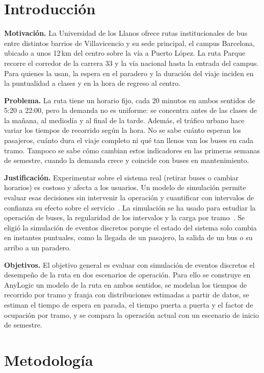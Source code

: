 \documentclass[runningheads]{llncs}
\begin{document}
\section{Introducción}

\textbf{Motivación.} La Universidad de los Llanos ofrece rutas institucionales de bus entre distintos barrios de Villavicencio y su sede principal, el campus Barcelona, ubicado a unos 12\,km del centro sobre la vía a Puerto López. La ruta Parque recorre el corredor de la carrera 33 y la vía nacional hasta la entrada del campus. Para quienes la usan, la espera en el paradero y la duración del viaje inciden en la puntualidad a clases y en la hora de regreso al centro.

\textbf{Problema.} La ruta tiene un horario fijo, cada 20 minutos en ambos sentidos de 5:20 a 22:00, pero la demanda no es uniforme: se concentra antes de las clases de la mañana, al mediodía y al final de la tarde. Además, el tráfico urbano hace variar los tiempos de recorrido según la hora. No se sabe cuánto esperan los pasajeros, cuánto dura el viaje completo ni qué tan llenos van los buses en cada tramo. Tampoco se sabe cómo cambian estos indicadores en las primeras semanas de semestre, cuando la demanda crece y coincide con buses en mantenimiento.

\textbf{Justificación.} Experimentar sobre el sistema real (retirar buses o cambiar horarios) es costoso y afecta a los usuarios. Un modelo de simulación permite evaluar esas decisiones sin intervenir la operación y cuantificar con intervalos de confianza su efecto sobre el servicio~\cite{law2015,banks2010}. La simulación se ha usado para estudiar la operación de buses, la regularidad de los intervalos y la carga por tramo~\cite{cats2010,ceder2016}. Se eligió la simulación de eventos discretos porque el estado del sistema solo cambia en instantes puntuales, como la llegada de un pasajero, la salida de un bus o su arribo a un paradero.

\textbf{Objetivos.} El objetivo general es evaluar con simulación de eventos discretos el desempeño de la ruta en dos escenarios de operación. Para ello se construye en AnyLogic un modelo de la ruta en ambos sentidos, se modelan los tiempos de recorrido por tramo y franja con distribuciones estimadas a partir de datos, se estiman el tiempo de espera en parada, el tiempo puerta a puerta y el factor de ocupación por tramo, y se compara la operación actual con un escenario de inicio de semestre.

\section{Metodología}
\end{document}

